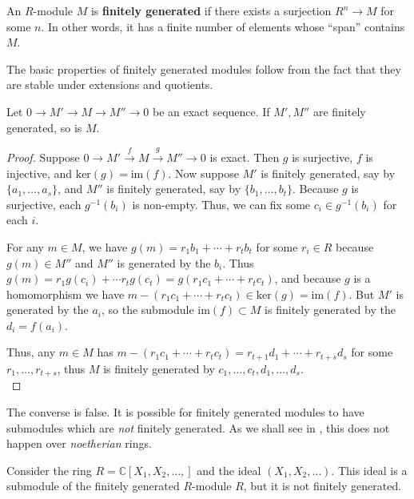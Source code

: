 \begin{definition} 
An $R$-module $M$ is \textbf{finitely generated} if there exists a surjection
$R^n \to M$ for some $n$. In other words, it has a finite number of elements
whose ``span'' contains $M$.
\end{definition} 

The basic properties of finitely generated modules follow from the fact that
they are stable under extensions and quotients.

\begin{proposition} \label{exact-fingen}
Let $0 \to M' \to M \to M'' \to 0$ be an exact sequence. If $M', M''$ are
finitely generated, so is $M$.
\end{proposition} 
\begin{proof} 
Suppose $0\rightarrow
M'\stackrel{f}{\rightarrow}M\stackrel{g}{\rightarrow}M''\rightarrow0$
is exact. Then $g$ is surjective, $f$ is injective, and
$\text{ker}(g)=\text{im}(f)$. Now suppose $M'$ is finitely generated,
say by $\{a_1,\ldots,a_s\}$, and $M''$ is finitely generated, say by
$\{b_1,\ldots,b_t\}$. Because $g$ is surjective, each $g^{-1}(b_i)$ is
non-empty. Thus, we can fix some $c_i\in g^{-1}(b_i)$ for each $i$.

For any
$m\in M$, we have $g(m)=r_1b_1+\cdots+r_tb_t$ for some $r_i\in R$ because
$g(m)\in M''$ and $M''$ is generated by the $b_i$. Thus $g(m)=r_1g(c_i)+\cdots
r_tg(c_t)=g(r_1c_1+\cdots+r_tc_t)$, and because $g$ is a homomorphism
we have $m-(r_1c_1+\cdots+r_tc_t)\in\text{ker}(g)=\text{im}(f)$. But
$M'$ is generated by the $a_i$, so the submodule $\text{im}(f)\subset
M$ is finitely generated by the $d_i=f(a_i)$.

Thus, any $m\in
M$ has $m-(r_1c_1+\cdots+r_tc_t)=r_{t+1}d_1+\cdots+r_{t+s}d_s$
for some $r_1,\ldots,r_{t+s}$, thus $M$ is finitely generated by
$c_1,\ldots,c_t,d_1,\ldots,d_s$.  \\

\end{proof} 

The converse is false. It is possible for finitely generated modules to have
submodules which are \emph{not} finitely generated. As we shall see in
, this does not happen over \emph{noetherian} rings.



\begin{example} 
Consider the ring $R=\mathbb{C}[X_1, X_2, \dots,]$ and the ideal $(X_1, X_2,
\dots)$. This ideal is a submodule of the finitely generated $R$-module $R$,
but it is not finitely generated.
\end{example} 

